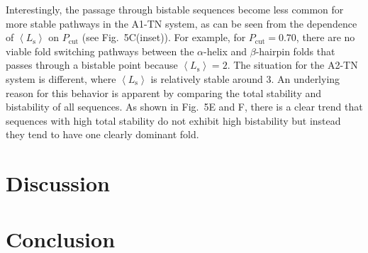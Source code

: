 \documentclass[%
 aip,
rsi,%
 amsmath,amssymb,
 reprint,%
]{revtex4-1}
\newcommand {\Pcut}     	{{P_\mathrm{cut}}}
\begin{document}
Interestingly, the passage through bistable sequences become less common for more stable pathways in the A1-TN system, as can be seen from the dependence of $\left <L_\mathrm{s}\right >$ on $\Pcut$ (see Fig.~5C(inset)). For example, for $\Pcut=0.70$, there are no viable fold switching pathways between the $\alpha$-helix and $\beta$-hairpin folds that passes through a bistable point because $\left <L_\mathrm{s}\right > =  2$. The situation for the A2-TN system is different, where $\left <L_\mathrm{s}\right >$ is relatively stable around 3. An underlying reason for this behavior is apparent by comparing the total stability and bistability of all sequences. As shown in Fig.~5E and F, there is a clear trend that sequences with high total stability do not exhibit high bistability but instead they tend to have one clearly dominant fold.

%
%
 
\section{Discussion}

\section{Conclusion}


\end{document}
